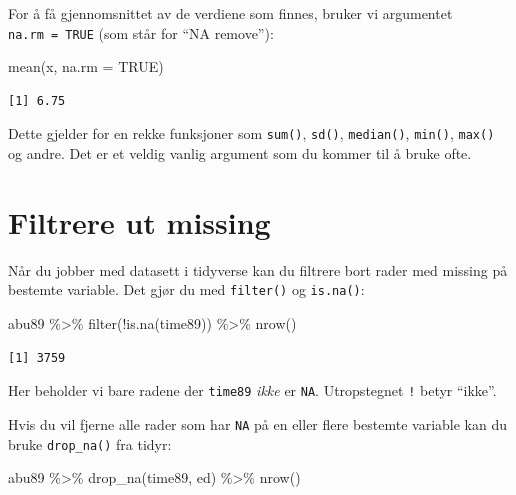 \documentclass[
  norsk,
  letterpaper,
  DIV=11,
  numbers=noendperiod]{scrreprt}
\newenvironment{Shaded}{\begin{snugshade}}{\end{snugshade}}
\newcommand{\AttributeTok}[1]{\textcolor[rgb]{0.40,0.45,0.13}{#1}}
\newcommand{\ConstantTok}[1]{\textcolor[rgb]{0.56,0.35,0.01}{#1}}
\newcommand{\FunctionTok}[1]{\textcolor[rgb]{0.28,0.35,0.67}{#1}}
\newcommand{\NormalTok}[1]{\textcolor[rgb]{0.00,0.23,0.31}{#1}}
\newcommand{\SpecialCharTok}[1]{\textcolor[rgb]{0.37,0.37,0.37}{#1}}
\theoremstyle{definition}
\theoremstyle{remark}
\begin{document}
For å få gjennomsnittet av de verdiene som finnes, bruker vi argumentet
\texttt{na.rm\ =\ TRUE} (som står for ``NA remove''):

\begin{Shaded}
\begin{Highlighting}[]
\FunctionTok{mean}\NormalTok{(x, }\AttributeTok{na.rm =} \ConstantTok{TRUE}\NormalTok{)}
\end{Highlighting}
\end{Shaded}

\begin{verbatim}
[1] 6.75
\end{verbatim}

Dette gjelder for en rekke funksjoner som \texttt{sum()}, \texttt{sd()},
\texttt{median()}, \texttt{min()}, \texttt{max()} og andre. Det er et
veldig vanlig argument som du kommer til å bruke ofte.

\section{Filtrere ut missing}\label{filtrere-ut-missing}

Når du jobber med datasett i tidyverse kan du filtrere bort rader med
missing på bestemte variable. Det gjør du med \texttt{filter()} og
\texttt{is.na()}:

\begin{Shaded}
\begin{Highlighting}[]
\NormalTok{abu89 }\SpecialCharTok{\%\textgreater{}\%}
  \FunctionTok{filter}\NormalTok{(}\SpecialCharTok{!}\FunctionTok{is.na}\NormalTok{(time89)) }\SpecialCharTok{\%\textgreater{}\%}
  \FunctionTok{nrow}\NormalTok{()}
\end{Highlighting}
\end{Shaded}

\begin{verbatim}
[1] 3759
\end{verbatim}

Her beholder vi bare radene der \texttt{time89} \emph{ikke} er
\texttt{NA}. Utropstegnet \texttt{!} betyr ``ikke''.

Hvis du vil fjerne alle rader som har \texttt{NA} på en eller flere
bestemte variable kan du bruke \texttt{drop\_na()} fra tidyr:

\begin{Shaded}
\begin{Highlighting}[]
\NormalTok{abu89 }\SpecialCharTok{\%\textgreater{}\%}
  \FunctionTok{drop\_na}\NormalTok{(time89, ed) }\SpecialCharTok{\%\textgreater{}\%}
  \FunctionTok{nrow}\NormalTok{()}
\end{Highlighting}
\end{Shaded}
\end{document}
